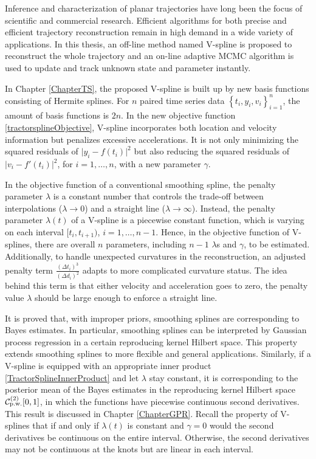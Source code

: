 
Inference and characterization of planar trajectories have long been the focus of scientific and commercial research. Efficient algorithms for both precise and efficient trajectory reconstruction remain in high demand in a wide variety of applications. In this thesis, an off-line method named V-spline is proposed to reconstruct the whole trajectory and an on-line adaptive MCMC algorithm is used to update and track unknown state and parameter instantly. 

In Chapter \ref{ChapterTS}, the proposed V-spline is built up by new basis functions consisting of Hermite splines. For $n$ paired time series data $\left\lbrace t_i,y_i,v_i\right\rbrace_{i=1}^{n}$, the amount of basis functions is $2n$. In the new objective function \eqref{tractorsplineObjective}, V-spline incorporates both location and velocity information but penalizes excessive accelerations. It is not only minimizing the squared residuals of $\lvert y_i-f(t_i)\rvert^2$ but also reducing the squared residuals of $\lvert v_i-f'(t_i)\rvert^2$, for $i=1,\ldots,n$, with a new parameter $\gamma$. 

In the objective function of a conventional smoothing spline, the penalty parameter $\lambda$ is a constant number that controls the trade-off between interpolations ($\lambda\to 0$) and a straight line ($\lambda\to \infty$). Instead, the penalty parameter $\lambda(t)$ of a V-spline is a piecewise constant function, which is varying on each interval $[t_i,t_{i+1})$, $i=1,\ldots,n-1$. Hence, in the objective function of  V-splines, there are overall $n$ parameters, including $n-1$ $\lambda$s and $\gamma$, to be estimated. Additionally, to handle unexpected curvatures in the reconstruction, an adjusted penalty term $\frac{(\Delta t_i)^3}{(\Delta d_i)^2}$ adapts to more complicated curvature status. The idea behind this term is that either velocity and acceleration goes to zero, the penalty value $\lambda$ should be large enough to enforce a straight line. 

It is proved that, with improper priors, smoothing splines are corresponding to Bayes estimates. In particular, smoothing splines can be interpreted by Gaussian process regression in a certain reproducing kernel Hilbert space. This property extends smoothing splines to more flexible and general applications. Similarly, if a V-spline is equipped with an appropriate inner product \eqref{TractorSplineInnerProduct} and let $\lambda$ stay constant, it is corresponding to the posterior mean of the Bayes estimates in the reproducing kernel Hilbert space $\mathcal{C}_{\mbox{\scriptsize p.w.}}^{(2)}[0,1]$, in which the functions have piecewise continuous second derivatives. This result is discussed in Chapter \ref{ChapterGPR}. Recall the property of V-splines that if and only if $\lambda(t)$ is constant and $\gamma=0$ would the second derivatives be continuous on the entire interval. Otherwise, the second derivatives may not be continuous at the knots but are linear in each interval. 


